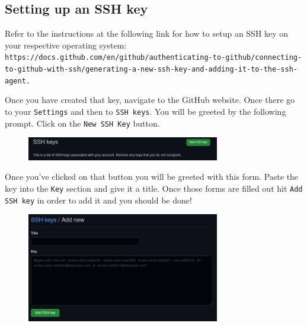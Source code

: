 \documentclass[a4paper,10pt]{article} %
\begin{document}
\subsection{Setting up an SSH key}

Refer to the instructions at the following link for how to setup an SSH key on
your respective operating system:
\lstinline|https://docs.github.com/en/github/authenticating-to-github/connecting-to-github-with-ssh/generating-a-new-ssh-key-and-adding-it-to-the-ssh-agent.|

%

Once you have created that key, navigate to the GitHub website. Once there go to your \lstinline|Settings| and then to \lstinline|SSH keys|. You will be greeted by the following prompt. Click on the \lstinline|New SSH Key| button.

\begin{figure}[H]
  \centering
  \includegraphics[width=0.75\textwidth]{./imgs/new_ssh.png}
\end{figure}

Once you've clicked on that button you will be greeted with this form. Paste the key into the \lstinline|Key| section and give it a title. Once those forms are filled out hit \lstinline|Add SSH key| in order to add it and you should be done!

\begin{figure}[H]
  \centering
  \includegraphics[width=0.75\textwidth]{./imgs/add_ssh.png}
\end{figure}
\end{document}
